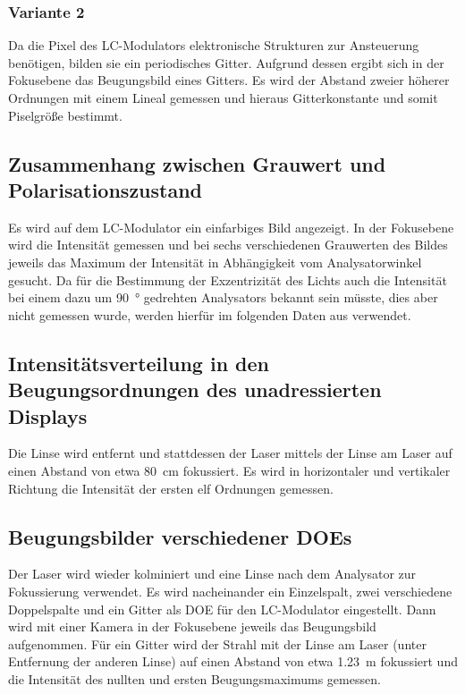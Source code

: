 \documentclass[
	a4paper,
	12pt,
	pagesize,
	ngerman
]{scrartcl}
\begin{document}
		\subsubsection*{Variante 2}
		Da die Pixel des LC-Modulators elektronische Strukturen zur Ansteuerung benötigen, bilden sie ein periodisches Gitter. %
		Aufgrund dessen ergibt sich in der Fokusebene das Beugungsbild eines Gitters.
		Es wird der Abstand zweier höherer Ordnungen mit einem Lineal gemessen und hieraus Gitterkonstante und somit Piselgröße bestimmt.


	\subsection{Zusammenhang zwischen Grauwert und Polarisationszustand}

		Es wird auf dem LC-Modulator ein einfarbiges Bild angezeigt. %
		In der Fokusebene wird die Intensität gemessen und bei sechs verschiedenen Grauwerten des Bildes jeweils das Maximum der Intensität in Abhängigkeit vom Analysatorwinkel gesucht.
		Da für die Bestimmung der Exzentrizität des Lichts auch die Intensität bei einem dazu um \SI{90}{\degree} gedrehten Analysators bekannt sein müsste, dies aber nicht gemessen wurde, werden hierfür im folgenden Daten aus \cite{JTZ} verwendet.

	\subsection{Intensitätsverteilung in den Beugungsordnungen des unadressierten Displays} %
	Die Linse wird entfernt und stattdessen der Laser mittels der Linse am Laser auf einen Abstand von etwa \SI{80}{\centi \meter} fokussiert. %
	Es wird in horizontaler und vertikaler Richtung die Intensität der ersten elf Ordnungen gemessen. %

	\subsection{Beugungsbilder verschiedener DOEs}
		Der Laser wird wieder kolminiert und eine Linse nach dem Analysator zur Fokussierung verwendet.
		Es wird nacheinander ein Einzelspalt, zwei verschiedene Doppelspalte und ein Gitter als DOE für den LC-Modulator eingestellt.
		Dann wird mit einer Kamera in der Fokusebene jeweils das Beugungsbild aufgenommen.
		Für ein Gitter wird der Strahl mit der Linse am Laser (unter Entfernung der anderen Linse) auf einen Abstand von etwa \SI{1,23}{m} fokussiert und die Intensität des nullten und ersten Beugungsmaximums gemessen.
\end{document}
